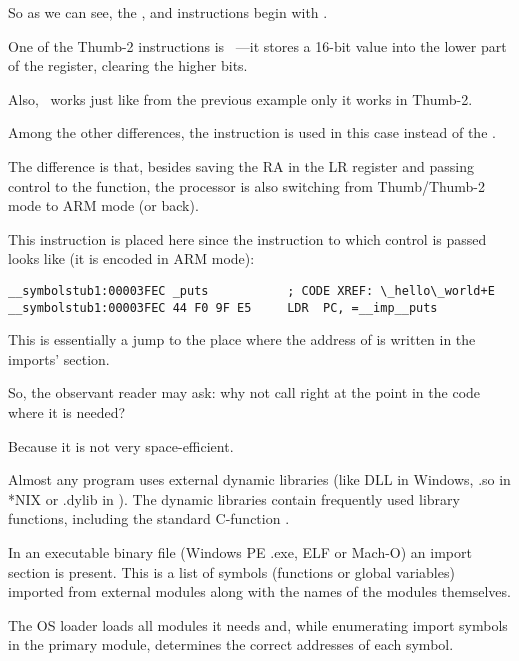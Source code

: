 
So as we can see, the ,  and  instructions begin with .

One of the Thumb-2 instructions is  ~---it stores a 16-bit value into the lower part of the  register, clearing the higher bits.

Also,  ~works just like  from the previous example only it works in Thumb-2.


Among the other differences, the  instruction is used in this case instead of the .

The difference is that, besides saving the \ac{RA} in the \ac{LR} register and passing control 
to the \puts function, the processor is also switching from Thumb/Thumb-2 mode to ARM mode (or back).

This instruction is placed here since the instruction to which control is passed looks like (it is encoded in ARM mode):

\begin{lstlisting}[style=customasmARM]
__symbolstub1:00003FEC _puts           ; CODE XREF: \_hello\_world+E
__symbolstub1:00003FEC 44 F0 9F E5     LDR  PC, =__imp__puts
\end{lstlisting}

This is essentially a jump to the place where the address of \puts is written in the imports' section.

So, the observant reader may ask: why not call \puts right at the point in the code where it is needed?

Because it is not very space-efficient.

Almost any program uses external dynamic libraries (like DLL in Windows, .so in *NIX or .dylib in \MacOSX).
The dynamic libraries contain frequently used library functions, including the standard C-function \puts.

In an executable binary file (Windows PE .exe, ELF or Mach-O) an import section is present.
This is a list of symbols (functions or global variables) imported from external modules along with the names of the modules themselves.

The \ac{OS} loader loads all modules it needs and, while enumerating import symbols in the primary module, determines the correct addresses of each symbol.

